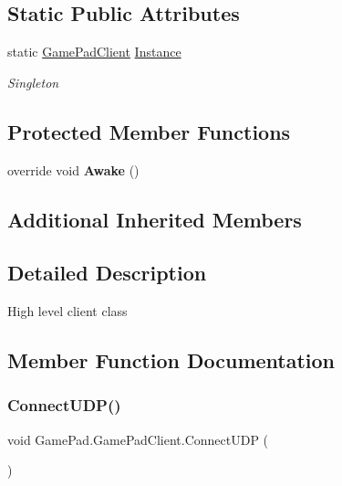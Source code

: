 \subsection*{Static Public Attributes}
\begin{DoxyCompactItemize}
\item 
static \mbox{\hyperlink{class_game_pad_1_1_game_pad_client}{Game\+Pad\+Client}} \mbox{\hyperlink{class_game_pad_1_1_game_pad_client_a88e2f429bed1bf7024fbb4ff590ce5da}{Instance}}
\begin{DoxyCompactList}\small\item\em Singleton \end{DoxyCompactList}\end{DoxyCompactItemize}
\subsection*{Protected Member Functions}
\begin{DoxyCompactItemize}
\item 
\mbox{\label{class_game_pad_1_1_game_pad_client_aa944b22936caa875c467864758cc929a}} 
override void {\bfseries Awake} ()
\end{DoxyCompactItemize}
\subsection*{Additional Inherited Members}


\subsection{Detailed Description}
High level client class 



\subsection{Member Function Documentation}
\mbox{\label{class_game_pad_1_1_game_pad_client_ac0cca46c6a1d0fa5e6f83729bcd248f6}} 
\subsubsection{\texorpdfstring{ConnectUDP()}{ConnectUDP()}}
{\footnotesize\ttfamily void Game\+Pad.\+Game\+Pad\+Client.\+Connect\+U\+DP (\begin{DoxyParamCaption}{ }\end{DoxyParamCaption})}



